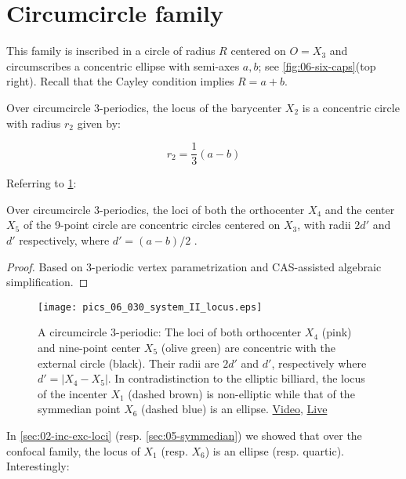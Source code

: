 \section{Circumcircle family}

This family is inscribed in a circle of radius $R$ centered on $O=X_3$ and circumscribes a concentric ellipse with semi-axes $a,b$; see     \cref{fig:06-six-caps}(top right). Recall that the Cayley condition implies $R=a+b$. 

\begin{proposition}
Over circumcircle 3-periodics, the locus of the barycenter $X_2$ is a concentric circle with radius $r_2$ given by:

\[ r_2 = \frac{1}{3}(a-b)  \]

\end{proposition}

Referring to \cref{fig:06-circum-x1456-loci}:

\begin{proposition}
Over circumcircle 3-periodics, the loci of both the orthocenter $X_4$ and the center $X_5$ of the 9-point circle are concentric circles centered on $X_3$, with radii $2 d'$ and $d'$ respectively, where $d'=(a-b)/2$ .
\label{prop:06-circum-x1456-loci}
\end{proposition}

\begin{proof}
Based on 3-periodic vertex parametrization and CAS-assisted algebraic simplification.
\end{proof}

\begin{figure}
    \centering
    \texttt{[image: pics\_06\_030\_system\_II\_locus.eps]}
    \caption{A circumcircle 3-periodic: The loci of both orthocenter $X_4$ (pink) and nine-point center $X_5$ (olive green) are concentric with the external circle (black). Their radii are $2d'$ and $d'$, respectively where $d'=|X_4-X_5|$. In contradistinction to the elliptic billiard, the locus of the incenter $X_1$ (dashed brown) is non-elliptic while that of the symmedian point $X_6$ (dashed blue) is an ellipse. \href{https://youtu.be/8xlYaQfQCTw}{Video}, \href{https://bit.ly/3vo8eWl}{Live}}
    \label{fig:06-circum-x1456-loci}
\end{figure}

In \cref{sec:02-inc-exc-loci} (resp. \cref{sec:05-symmedian}) we showed that over the confocal family, the locus of $X_1$ (resp. $X_6$) is an ellipse (resp. quartic). Interestingly:

